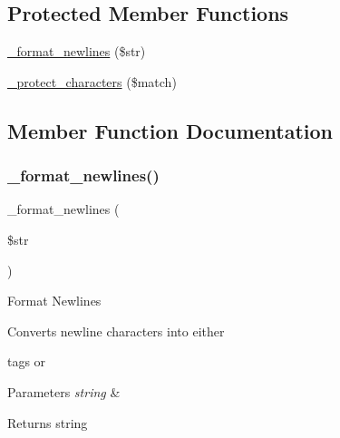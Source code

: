 \subsection*{Protected Member Functions}
\begin{DoxyCompactItemize}
\item 
\mbox{\hyperlink{class_c_i___typography_ac3384cbfc88fcd17e40624bdd6002801}{\+\_\+format\+\_\+newlines}} (\$str)
\item 
\mbox{\hyperlink{class_c_i___typography_a03e8f97de4301e0fe0cf0e9f0bcd936c}{\+\_\+protect\+\_\+characters}} (\$match)
\end{DoxyCompactItemize}


\subsection{Member Function Documentation}
\mbox{\label{class_c_i___typography_ac3384cbfc88fcd17e40624bdd6002801}} 
\subsubsection{\texorpdfstring{\+\_\+format\+\_\+newlines()}{\_format\_newlines()}}
{\footnotesize\ttfamily \+\_\+format\+\_\+newlines (\begin{DoxyParamCaption}\item[{}]{\$str }\end{DoxyParamCaption})\hspace{0.3cm}{\ttfamily [protected]}}

Format Newlines

Converts newline characters into either 

tags or ~\newline



\begin{DoxyParams}{Parameters}
{\em string} & \\
\hline
\end{DoxyParams}
\begin{DoxyReturn}{Returns}
string 
\end{DoxyReturn}
\mbox{\label{class_c_i___typography_a03e8f97de4301e0fe0cf0e9f0bcd936c}} 
